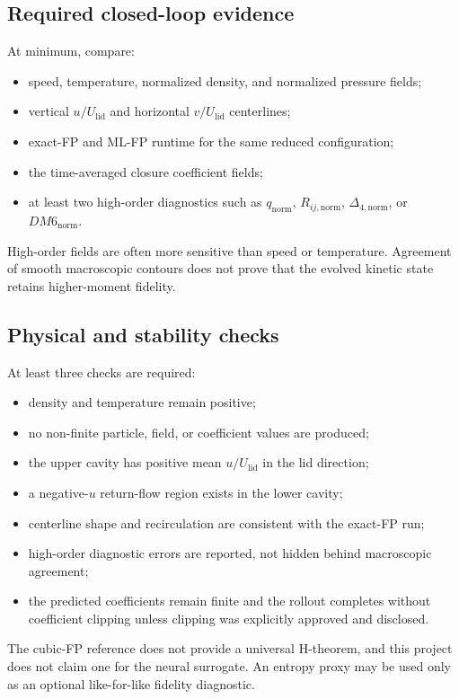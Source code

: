 \documentclass[11pt]{article}
\begin{document}
\subsection{Required closed-loop evidence}
At minimum, compare:
\begin{itemize}
\item speed, temperature, normalized density, and normalized pressure fields;
\item vertical $u/U_{\mathrm{lid}}$ and horizontal $v/U_{\mathrm{lid}}$ centerlines;
\item exact-FP and ML-FP runtime for the same reduced configuration;
\item the time-averaged closure coefficient fields;
\item at least two high-order diagnostics such as $q_{\mathrm{norm}}$, $R_{ij,\mathrm{norm}}$, $\Delta_{4,\mathrm{norm}}$, or $DM6_{\mathrm{norm}}$.
\end{itemize}
High-order fields are often more sensitive than speed or temperature. Agreement of smooth macroscopic contours does not prove that the evolved kinetic state retains higher-moment fidelity.

\subsection{Physical and stability checks}
At least three checks are required:
\begin{itemize}
\item density and temperature remain positive;
\item no non-finite particle, field, or coefficient values are produced;
\item the upper cavity has positive mean $u/U_{\mathrm{lid}}$ in the lid direction;
\item a negative-$u$ return-flow region exists in the lower cavity;
\item centerline shape and recirculation are consistent with the exact-FP run;
\item high-order diagnostic errors are reported, not hidden behind macroscopic agreement;
\item the predicted coefficients remain finite and the rollout completes without coefficient clipping unless clipping was explicitly approved and disclosed.
\end{itemize}
The cubic-FP reference does not provide a universal H-theorem, and this project does not claim one for the neural surrogate. An entropy proxy may be used only as an optional like-for-like fidelity diagnostic.
\end{document}
